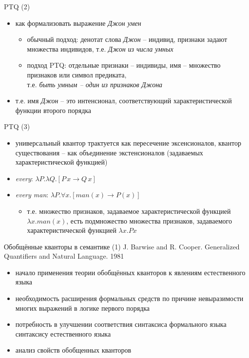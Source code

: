 \documentclass{beamer}
\begin{document}
\begin{frame}{PTQ (2)}
\begin{itemize}
	\item как формализовать выражение \textit{Джон умен}
	\medskip
	\begin{itemize}
    	\item обычный подход: денотат слова \textit{Джон} -- индивид, признаки задают множества индивидов, т.е. \textit{Джон из числа умных}
    	\medskip
    	\item подход PTQ: отдельные признаки -- индивиды, имя -- множество признаков или символ предиката,\\ т.е. \textit{быть умным -- один из признаков Джона}
    \end{itemize}
    \medskip
    \item т.е. имя \textit{Джон} -- это интенсионал, соответствующий характеристической функции второго порядка
\end{itemize}
\end{frame}

\begin{frame}{PTQ (3)}
\begin{itemize}
	\item универсальный квантор трактуется как пересечение эксенсионалов, квантор существования -- как объединение экстенсионалов (задаваемых характеристической функцией)
	\medskip
    \item \textit{every}: $\lambda P . \lambda Q . [ P\,x \to Q\,x ]$
    \medskip
    \item \textit{every man}: $\lambda P . \forall x . [ man(x) \to P(x) ]$ 
        \medskip
        \begin{itemize}
            \item[] т.е. множество признаков, задаваемое характеристической функцией $\lambda x . man(x)$, есть подмножество множества признаков, задаваемого характеристической функцией $\lambda x . Px$
        \end{itemize}
\end{itemize}
\end{frame}

\begin{frame}{Обобщённые кванторы в семантике (1)}
J. Barwise and R. Cooper. Generalized Quantifiers and Natural Language. 1981
\bigskip
\begin{itemize}
	\item начало применения теории обобщённых кванторов к явлениям естественного языка
	\item необходимость расширения формальных средств по причине невыразимости многих выражений в логике первого порядка
	\item потребность в улучшении соответствия синтаксиса формального языка синтаксису естественного языка
	\item анализ свойств обобщенных кванторов
\end{itemize}
\end{frame}
\end{document}
